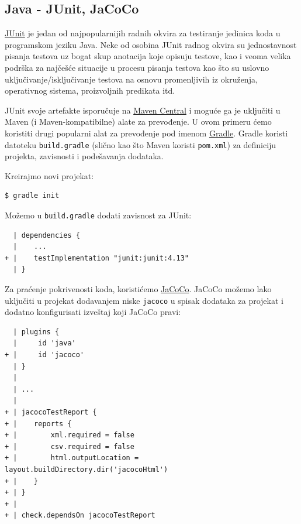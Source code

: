 \subsection{Java - JUnit, JaCoCo}\label{java---junit-jacoco}

\href{https://junit.org/}{JUnit} je jedan od najpopularnijih radnih okvira za testiranje jedinica koda u programskom jeziku Java. Neke od osobina JUnit radnog okvira su jednostavnost pisanja testova uz bogat skup anotacija koje opisuju testove, kao i veoma velika podrška za najčešće situacije u procesu pisanja testova kao što su uslovno uključivanje/isključivanje testova na osnovu promenljivih iz okruženja, operativnog sistema, proizvoljnih predikata itd.

JUnit svoje artefakte isporučuje na \href{https://search.maven.org/}{Maven Central} i moguće ga je uključiti u Maven (i Maven-kompatibilne) alate za prevođenje. U ovom primeru ćemo koristiti drugi popularni alat za prevođenje pod imenom \href{https://gradle.org/}{Gradle}. Gradle koristi datoteku \texttt{build.gradle} (slično kao što Maven koristi \texttt{pom.xml}) za definiciju projekta, zavisnosti i podešavanja dodataka.

Kreirajmo novi projekat:

\begin{verbatim}
$ gradle init
\end{verbatim}

Možemo u \texttt{build.gradle} dodati zavisnost za JUnit:

\begin{verbatim}
  | dependencies {
  |    ...
+ |    testImplementation "junit:junit:4.13"
  | }
\end{verbatim}

Za praćenje pokrivenosti koda, koristićemo \href{https://www.jacoco.org/jacoco/}{JaCoCo}. JaCoCo možemo lako uključiti u projekat dodavanjem niske \texttt{\textquotesingle{}jacoco\textquotesingle{}} u spisak dodataka za projekat i dodatno konfigurisati izveštaj koji JaCoCo pravi:

\begin{verbatim}
  | plugins {
  |     id 'java'
+ |     id 'jacoco'
  | }
  |
  | ...
  |
+ | jacocoTestReport {
+ |    reports {
+ |        xml.required = false
+ |        csv.required = false
+ |        html.outputLocation = layout.buildDirectory.dir('jacocoHtml')
+ |    }
+ | }
+ |
+ | check.dependsOn jacocoTestReport
\end{verbatim}

